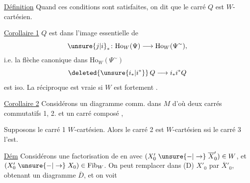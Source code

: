
\uline{Définition} Quand ces conditions sont satisfaites, on dit que le carré $Q$ est $W$-cartésien.

\uline{Corollaire 1}    $Q$  est dans l'image essentielle de 
\[
\unsure{j|i}_*\colon\mathrm{Ho}_W(\Psi)\longrightarrow\mathrm{Ho}_W(\Psi^{\sim}),
\]
i.e. la flèche canonique dans $\mathrm{Ho}_W(\Psi^{\sim})$
\[
\deleted{\unsure{i_*|i^*}}\,Q\longrightarrow i_*i^*Q
\]
est iso. La réciproque est vraie si $W$ est fortement .

\uline{Corollaire 2} Considérons un diagramme comm. dans $M$
d'où deux carrés commutatifs 1, 2. et un carré composé ,

Supposons le carré 1 $W$-cartésien. Alors le carré 2 est $W$-cartésien ssi le carré 3 l'est.

\uline{Dém} Considérons une factorisation de
en
avec $(X'_0\mathrel{\unsure{-|\to}}\overline X'_0)\in W$, et $(X'_0\mathrel{\unsure{-|\to}}X_0)\in\mathrm{Fib}_W$. On peut  remplacer dans (D) $X'_0$ par $\overline X'_0$,  obtenant un diagramme $\overline D$, et on voit 
